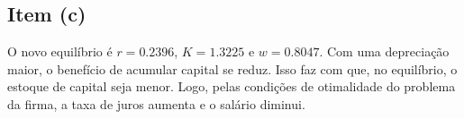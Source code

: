 \documentclass{article}
\begin{document}
\subsection*{Item (c)}

O novo equilíbrio é $r=0.2396$, $K=1.3225$ e $w=0.8047$. Com uma depreciação maior, o benefício de acumular capital se reduz. Isso faz com que, no equilíbrio, o estoque de capital seja menor. Logo, pelas condições de otimalidade do problema da firma, a taxa de juros aumenta e o salário diminui. 
\end{document}

